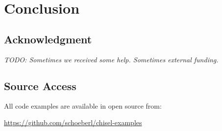 \documentclass[a4paper]{article}
\newcommand{\todo}[1]{{\emph{TODO: #1}}}
\begin{document}
\section{Conclusion}
\label{sec:conclusion}


\subsection*{Acknowledgment}

\todo{Sometimes we received some help. Sometimes external funding.}



\subsection*{Source Access}

All code examples are available in open source from:

\url{https://github.com/schoeberl/chisel-examples}



\end{document}
